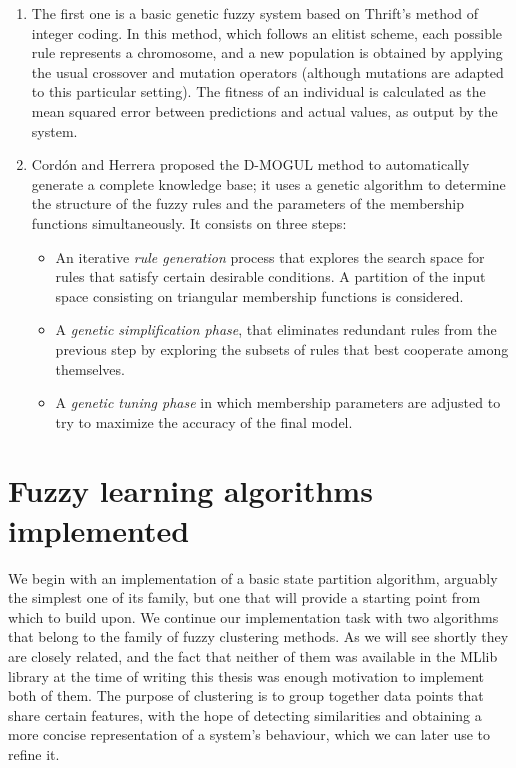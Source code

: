 \begin{enumerate}[1.]
  \item The first one is a basic genetic fuzzy system based on Thrift's method \cite{thrift1991genetic} of integer coding. In this method, which follows an elitist scheme, each possible rule represents a chromosome, and a new population is obtained by applying the usual crossover and mutation operators (although mutations are adapted to this particular setting). The fitness of an individual is calculated as the mean squared error between predictions and actual values, as output by the system.
  \item Cordón and Herrera proposed the D-MOGUL method \cite{cordon1997three} to automatically generate a complete knowledge base; it uses a genetic algorithm to determine the structure of the fuzzy rules and the parameters of the membership functions simultaneously. It consists on three steps:
  \begin{itemize}
    \item An iterative \textit{rule generation} process that explores the search space for rules that satisfy certain desirable conditions. A partition of the input space consisting on triangular membership functions is considered.
    \item A \textit{genetic simplification phase}, that eliminates redundant rules from the previous step by exploring the subsets of rules that best cooperate among themselves.
    \item A \textit{genetic tuning phase} in which membership parameters are adjusted to try to maximize the accuracy of the final model.
  \end{itemize}
\end{enumerate}

\section{Fuzzy learning algorithms implemented}

We begin with an implementation of a basic state partition algorithm, arguably the simplest one of its family, but one that will provide a starting point from which to build upon. We continue our implementation task with two algorithms that belong to the family of fuzzy clustering methods. As we will see shortly they are closely related, and the fact that neither of them was available in the MLlib library at the time of writing this thesis was enough motivation to implement both of them. The purpose of clustering is to group together data points that share certain features, with the hope of detecting similarities and obtaining a more concise representation of a system's behaviour, which we can later use to refine it.

